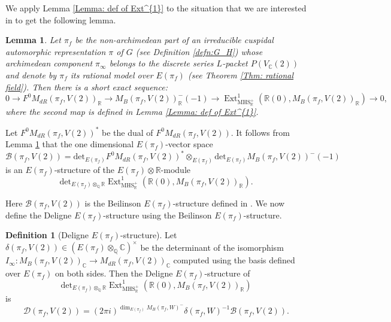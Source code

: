 \documentclass[11pt, a4paper]{amsart}
\theoremstyle{plain}
\newtheorem{lemma}[theorem]{Lemma}
\theoremstyle{definition}
\newtheorem{definition}[theorem]{Definition}
\numberwithin{equation}{section}
\def\CC{\mathbb{C}}
\def\QQ{\mathbb{Q}}
\def\RR{\mathbb{R}}
\DeclareMathOperator{\Ext}{Ext}
\begin{document}
We apply Lemma \ref{Lemma: def of Ext^{1}} to the situation that we are interested in to get the following lemma.

\begin{lemma}
\label{Lemma: exact seq to def Ext^{1} in our situation}
     Let $\pi_{f}$ be the non-archimedean part of an irreducible cuspidal automorphic representation $\pi$ of $G$ (see Definition \ref{defn:G_H}) whose archimedean component $\pi_{\infty}$ belongs to the discrete series $L$-packet $P(V_{\CC}(2))$ and denote by $\pi_{f}$ its rational model over $E(\pi_f)$ (see Theorem \ref{Thm: rational field}). Then there is a short exact sequence:
     \begin{equation} \label{exact seq: Ext^1}
          0 \rightarrow F^{0}M_{dR}(\pi_f, V(2))_{\RR} \rightarrow M_{B}(\pi_f, V(2))^{-}_{\RR}(-1) \rightarrow \Ext^{1}_{\mathrm{MHS_{\RR}^{+}}}(\RR(0), M_{B}(\pi_f, V(2))_{\RR}) \rightarrow 0,
     \end{equation}
     where the second map is defined in Lemma \ref{Lemma: def of Ext^{1}}. 
\end{lemma}

Let $F^{0}M_{dR}(\pi_f, V(2))^{*}$ be the dual of $F^{0}M_{dR}(\pi_f, V(2))$. It follows from Lemma \ref{Lemma: exact seq to def Ext^{1} in our situation} that the one dimensional $E(\pi_f)$-vector space 
\begin{equation*}
    \mathcal{B}(\pi_f, V(2)) = \mathrm{det}_{E(\pi_f)} F^{0}M_{dR}(\pi_f, V(2))^{*} \otimes_{E(\pi_f)} \mathrm{det}_{E(\pi_f)} M_{B}(\pi_f, V(2))^{-}(-1) 
\end{equation*}
is an $E(\pi_f)$-structure of the $E(\pi_f)\otimes \RR$-module 
\begin{equation*}
    \mathrm{det}_{E(\pi_f)\otimes_{\QQ}\RR}\Ext^{1}_{\mathrm{MHS_{\RR}^{+}}}(\RR(0), M_{B}(\pi_f, V(2))_{\RR}).
\end{equation*}

Here $\mathcal{B}(\pi_f, V(2))$ is the Beilinson $E(\pi_f)$-structure defined in \cite[\S6.1]{Nekovar94}. We now define the Deligne $E(\pi_f)$-structure using the Beilinson $E(\pi_f)$-structure.

\begin{definition}[Deligne $E(\pi_f)$-structure]
\label{def: Delign-rational structure}
    Let $\delta(\pi_f, V(2)) \in (E(\pi_f) \otimes_{\QQ} \CC)^{\times}$ be the determinant of the isomorphism $I_{\infty} \colon M_{B}(\pi_f, V(2))_{\CC} \rightarrow M_{dR}(\pi_f, V(2))_{\CC}$ computed using the basis defined over $E(\pi_f)$ on both sides. Then the Deligne $E(\pi_f)$-structure of 
    \begin{equation*}
            \mathrm{det}_{E(\pi_f)\otimes_{\QQ}\RR}\Ext^{1}_{\mathrm{MHS_{\RR}^{+}}}(\RR(0), M_{B}(\pi_f, V(2))_{\RR})
    \end{equation*}
    is 
    \begin{equation*}
        \mathcal{D}(\pi_f, V(2)) = (2\pi i)^{\dim_{E(\pi_f)} M_{B}(\pi_f, W)^{-}} \delta(\pi_f, W)^{-1} \mathcal{B}(\pi_f, V(2)). 
    \end{equation*}
\end{definition}
\end{document}
